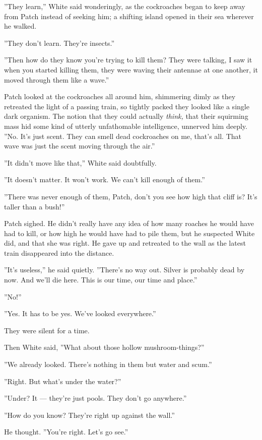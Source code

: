 \documentclass[12pt]{book}
\begin{document}
''They learn,'' White said wonderingly, as the cockroaches began to keep away from Patch instead of seeking him; a shifting island opened in their sea wherever he walked.

''They don't learn. They're insects.''

''Then how do they know you're trying to kill them? They were talking, I saw it when you started killing them, they were waving their antennae at one another, it moved through them like a wave.''

Patch looked at the cockroaches all around him, shimmering dimly as they retreated the light of a passing train, so tightly packed they looked like a single dark organism. The notion that they could actually {\it think,} that their squirming mass hid some kind of utterly unfathomable intelligence, unnerved him deeply. ''No. It's just scent. They can smell dead cockroaches on me, that's all. That wave was just the scent moving through the air.''

''It didn't move like that,'' White said doubtfully.

''It doesn't matter. It won't work. We can't kill enough of them.''

''There was never enough of them, Patch, don't you see how high that cliff is? It's taller than a bush!''

Patch sighed. He didn't really have any idea of how many roaches he would have had to kill, or how high he would have had to pile them, but he suspected White did, and that she was right. He gave up and retreated to the wall as the latest train disappeared into the distance.

''It's useless,'' he said quietly. ''There's no way out. Silver is probably dead by now. And we'll die here. This is our time, our time and place.''

''No!''

''Yes. It has to be yes. We've looked everywhere.''

They were silent for a time.

Then White said, ''What about those hollow mushroom-things?''

''We already looked. There's nothing in them but water and scum.''

''Right. But what's under the water?''

''Under? It ---
they're just pools. They don't go anywhere.''

''How do you know? They're right up against the wall.''

He thought. ''You're right. Let's go see.''
\end{document}
